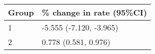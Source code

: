 \begin{tabular}{ll}
  \hline
Group & \% change in rate (95\%CI) \\ 
  \hline
   1 & -5.555 (-7.120, -3.965) \\ 
     2 & 0.778 (0.581, 0.976) \\ 
   \hline
\end{tabular}

